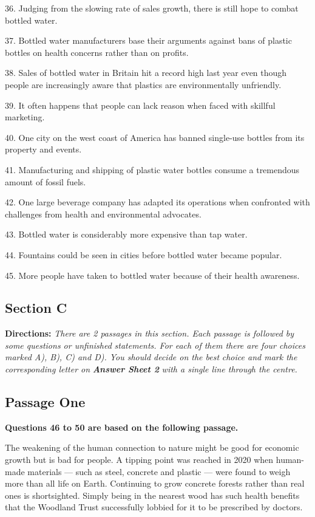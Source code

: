 \documentclass[UTF8,11pt]{ctexart}
\begin{document}
36. Judging from the slowing rate of sales growth, there is still hope to combat bottled water.


37. Bottled water manufacturers base their arguments against bans of plastic bottles on health concerns rather than on profits.


38. Sales of bottled water in Britain hit a record high last year even though people are increasingly aware that plastics are environmentally unfriendly.


39. It often happens that people can lack reason when faced with skillful marketing.


40. One city on the west coast of America has banned single-use bottles from its property and events.


41. Manufacturing and shipping of plastic water bottles consume a tremendous amount of fossil fuels.


42. One large beverage company has adapted its operations when confronted with challenges from health and environmental advocates.


43. Bottled water is considerably more expensive than tap water.


44. Fountains could be seen in cities before bottled water became popular.


45. More people have taken to bottled water because of their health awareness.


\subsection*{\textbf{Section C}}


\textbf{Directions: }\textit{There are 2 passages in this section. Each passage is followed by some questions or unfinished} \textit{statements. For each of them there are four choices marked A), B), C) and D). You should decide on the best} \textit{choice and mark the corresponding letter on }\textbf{\textit{Answer Sheet 2}}\textit{ with a single line through the centre.}


\subsection*{\textbf{Passage One}}


\textbf{Questions 46 to 50 are based on the following passage.}


The weakening of the human connection to nature might be good for economic growth but is bad for people. A tipping point was reached in 2020 when human-made materials — such as steel, concrete and plastic — were found to weigh more than all life on Earth. Continuing to grow concrete forests rather than real ones is shortsighted. Simply being in the nearest wood has such health benefits that the Woodland Trust successfully lobbied for it to be prescribed by doctors.
\end{document}
